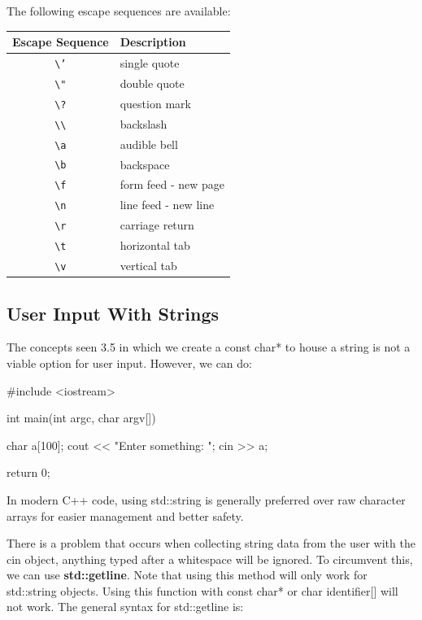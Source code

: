 \documentclass{report}
\begin{document}
    The following escape sequences are available:
    \begin{center}
    \begin{tabular}{|c|l|}
        \hline
        \textbf{Escape Sequence} & \textbf{Description} \\
        \hline
        \texttt{\textbackslash'} & single quote \\
        \texttt{\textbackslash"} & double quote \\
        \texttt{\textbackslash?} & question mark \\
        \texttt{\textbackslash\textbackslash} & backslash \\
        \texttt{\textbackslash a} & audible bell \\
        \texttt{\textbackslash b} & backspace \\
        \texttt{\textbackslash f} & form feed - new page \\
        \texttt{\textbackslash n} & line feed - new line \\
        \texttt{\textbackslash r} & carriage return \\
        \texttt{\textbackslash t} & horizontal tab \\
        \texttt{\textbackslash v} & vertical tab \\
        \hline
        \end{tabular}
    \end{center}


    \pagebreak
    \subsection{User Input With Strings}
    \bigbreak \noindent 
    \begin{remark}
        The concepts seen 3.5 in which we create a const char* to house a string is not a viable option for user input. However, we can do:
    \end{remark}

        \bigbreak \noindent 
        
        \begin{cppcode}
#include <iostream>

int main(int argc, char argv[]){

    char a[100];
    cout << "Enter something: ";
    cin >> a;

    return 0;
}
        \end{cppcode}
        
    \bigbreak \noindent 
    \begin{notebox}
			In modern C++ code, using std::string is generally preferred over raw character arrays for easier management and better safety.
		\end{notebox}
    \bigbreak \noindent 
    There is a problem that occurs when collecting string data from the user with the cin object, anything typed after a whitespace will be ignored. To circumvent this, we can use \textbf{std::getline}. Note that using this method will only work for std::string objects. Using this function with const char* or char identifier[] will not work.
    \bigbreak \noindent 
    The general syntax for std::getline is:
    \smallbreak \noindent
    
\end{document}

